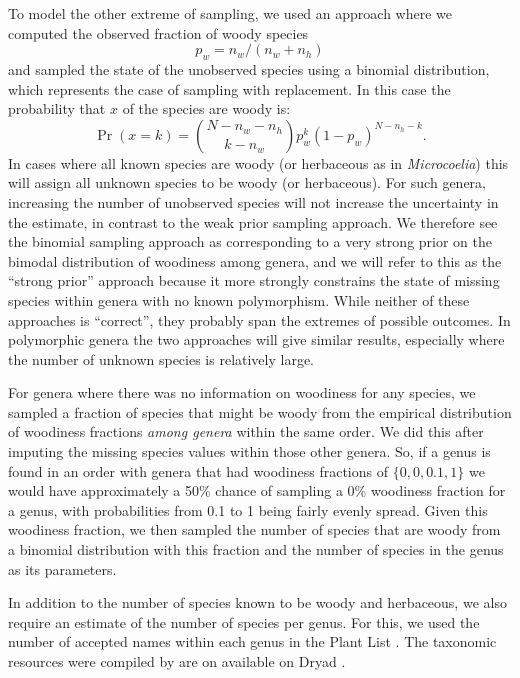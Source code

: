 To model the other extreme of sampling, we used an approach where we
computed the observed fraction of woody species 
\[p_w = n_w / (n_w +n_h)\] 
and sampled the state of the unobserved species using a
binomial distribution, which represents the case of sampling
with replacement. In this case the probability that $x$ of the species
are woody is:
\begin{equation}
  \Pr(x = k) = {N - n_w - n_h \choose k - n_w} 
  p_w^k (1-p_w)^{N - n_h - k}.
\end{equation}
%
In cases where all known species are woody (or herbaceous as in
\textit{Microcoelia}) this will assign all unknown species to be woody
(or herbaceous). For such genera, increasing the number of unobserved
species will not increase the uncertainty in the estimate, in contrast
to the weak prior sampling approach.
%
We therefore see the binomial sampling approach as corresponding to a
very strong prior on the bimodal distribution of woodiness among
genera, and we will refer to this as the ``strong prior'' approach
because it more strongly constrains the state of missing species
within genera with no known polymorphism.  While neither of these
approaches is ``correct'', they probably span the extremes of possible
outcomes.
%
In polymorphic genera the two approaches will give similar results,
especially where the number of unknown species is relatively large.

For genera where there was no information on woodiness for any
species, we sampled a fraction of species that might be woody from
the empirical distribution of woodiness fractions \textit{among
  genera} within the same order. We did this after imputing the
missing species values within those other genera. So, if a genus is
found in an order with genera that had woodiness fractions of $\{0, 0,
0.1, 1\}$ we would have approximately a 50\% chance of sampling a 0\%
woodiness fraction for a genus, with probabilities from 0.1 to 1 being
fairly evenly spread.  Given this woodiness fraction, we then sampled
the number of species that are woody from a binomial distribution with
this fraction and the number of species in the genus as its
parameters.

In addition to the number of species known to be woody and herbaceous,
we also require an estimate of the number of species per genus.  For this, we
used the number of accepted names within each genus in the Plant List
\citep{theplantlist}. The taxonomic resources were compiled by \citet{Zanne}
are on available on Dryad \citep{ZanneDryad}.


